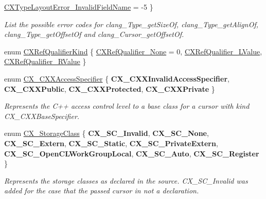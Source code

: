 \begin{DoxyCompactItemize}
\newline
\mbox{\hyperlink{group__CINDEX__TYPES_ggaaf1b95e9e7e792a08654563fef7502c1abed9d9641401ced4cd5e2ef9f31ad204}{C\+X\+Type\+Layout\+Error\+\_\+\+Invalid\+Field\+Name}} = -\/5
 \}
\begin{DoxyCompactList}\small\item\em List the possible error codes for {\ttfamily clang\+\_\+\+Type\+\_\+get\+Size\+Of}, {\ttfamily clang\+\_\+\+Type\+\_\+get\+Align\+Of}, {\ttfamily clang\+\_\+\+Type\+\_\+get\+Offset\+Of} and {\ttfamily clang\+\_\+\+Cursor\+\_\+get\+Offset\+Of}. \end{DoxyCompactList}\item 
enum \mbox{\hyperlink{group__CINDEX__TYPES_ga28389bbe03a77eded92086f0011d86eb}{C\+X\+Ref\+Qualifier\+Kind}} \{ \mbox{\hyperlink{group__CINDEX__TYPES_gga28389bbe03a77eded92086f0011d86eba9d740e1eb2e30202f534a6d52e92b5bb}{C\+X\+Ref\+Qualifier\+\_\+\+None}} = 0, 
\mbox{\hyperlink{group__CINDEX__TYPES_gga28389bbe03a77eded92086f0011d86eba49ef0f85293bf264e6a546511a207426}{C\+X\+Ref\+Qualifier\+\_\+\+L\+Value}}, 
\mbox{\hyperlink{group__CINDEX__TYPES_gga28389bbe03a77eded92086f0011d86ebab8e1f464c24e64fab52070341f02a9a0}{C\+X\+Ref\+Qualifier\+\_\+\+R\+Value}}
 \}
\item 
\mbox{\label{group__CINDEX__TYPES_ga26763f9b0b167116c047e2ef4f221c5f}} 
enum \mbox{\hyperlink{group__CINDEX__TYPES_ga26763f9b0b167116c047e2ef4f221c5f}{C\+X\+\_\+\+C\+X\+X\+Access\+Specifier}} \{ {\bfseries C\+X\+\_\+\+C\+X\+X\+Invalid\+Access\+Specifier}, 
{\bfseries C\+X\+\_\+\+C\+X\+X\+Public}, 
{\bfseries C\+X\+\_\+\+C\+X\+X\+Protected}, 
{\bfseries C\+X\+\_\+\+C\+X\+X\+Private}
 \}
\begin{DoxyCompactList}\small\item\em Represents the C++ access control level to a base class for a cursor with kind C\+X\+\_\+\+C\+X\+X\+Base\+Specifier. \end{DoxyCompactList}\item 
\mbox{\label{group__CINDEX__TYPES_ga03a15eaa53465d7f3ce7d88743241d7e}} 
enum \mbox{\hyperlink{group__CINDEX__TYPES_ga03a15eaa53465d7f3ce7d88743241d7e}{C\+X\+\_\+\+Storage\+Class}} \{ \newline
{\bfseries C\+X\+\_\+\+S\+C\+\_\+\+Invalid}, 
{\bfseries C\+X\+\_\+\+S\+C\+\_\+\+None}, 
{\bfseries C\+X\+\_\+\+S\+C\+\_\+\+Extern}, 
{\bfseries C\+X\+\_\+\+S\+C\+\_\+\+Static}, 
\newline
{\bfseries C\+X\+\_\+\+S\+C\+\_\+\+Private\+Extern}, 
{\bfseries C\+X\+\_\+\+S\+C\+\_\+\+Open\+C\+L\+Work\+Group\+Local}, 
{\bfseries C\+X\+\_\+\+S\+C\+\_\+\+Auto}, 
{\bfseries C\+X\+\_\+\+S\+C\+\_\+\+Register}
 \}
\begin{DoxyCompactList}\small\item\em Represents the storage classes as declared in the source. C\+X\+\_\+\+S\+C\+\_\+\+Invalid was added for the case that the passed cursor in not a declaration. \end{DoxyCompactList}\end{DoxyCompactItemize}
